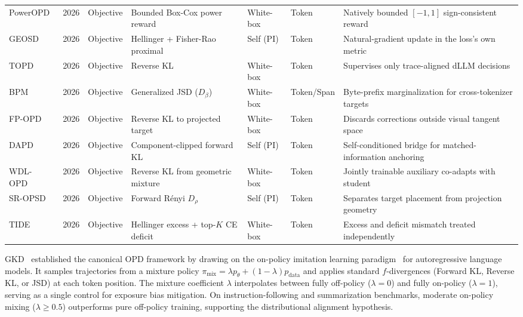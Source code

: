 \documentclass{article} %
\newcommand{\ptheta}{p_\theta}
\newcommand{\pdata}{p_{\mathrm{data}}}
\begin{document}
\begin{table}[t]
{\begin{tabular}{@{}lclllll@{}}
        PowerOPD~\citep{2606.17199} & 2026 & Objective & Bounded Box-Cox power reward & White-box & Token & Natively bounded $[-1,1]$ sign-consistent reward \\
        GEOSD~\citep{2607.06855} & 2026 & Objective & Hellinger + Fisher-Rao proximal & Self (PI) & Token & Natural-gradient update in the loss's own metric \\
        TOPD~\citep{2607.16872} & 2026 & Objective & Reverse KL & White-box & Token & Supervises only trace-aligned dLLM decisions \\
        BPM~\citep{2607.22334} & 2026 & Objective & Generalized JSD ($D_\beta$) & White-box & Token/Span & Byte-prefix marginalization for cross-tokenizer targets \\
        FP-OPD~\citep{2608.01263} & 2026 & Objective & Reverse KL to projected target & White-box & Token & Discards corrections outside visual tangent space \\
        DAPD~\citep{2608.01735} & 2026 & Objective & Component-clipped forward KL & Self (PI) & Token & Self-conditioned bridge for matched-information anchoring \\
        WDL-OPD~\citep{2608.09447} & 2026 & Objective & Reverse KL from geometric mixture & White-box & Token & Jointly trainable auxiliary co-adapts with student \\
        SR-OPSD~\citep{2608.09745} & 2026 & Objective & Forward R\'enyi $D_\rho$ & Self (PI) & Token & Separates target placement from projection geometry \\
        TIDE~\citep{2608.09836} & 2026 & Objective & Hellinger excess + top-$K$ CE deficit & White-box & Token & Excess and deficit mismatch treated independently \\
        \bottomrule
    \end{tabular}
    }
\end{table}

GKD~\citep{2306.13649} established the canonical OPD framework by drawing on the on-policy imitation learning paradigm~\citep{1011.0686} for autoregressive language models. It samples trajectories from a mixture policy $\pi_{\mathrm{mix}} = \lambda \ptheta + (1-\lambda) \pdata$ and applies standard $f$-divergences (Forward KL, Reverse KL, or JSD) at each token position. The mixture coefficient $\lambda$ interpolates between fully off-policy ($\lambda=0$) and fully on-policy ($\lambda=1$), serving as a single control for exposure bias mitigation. On instruction-following and summarization benchmarks, moderate on-policy mixing ($\lambda \geq 0.5$) outperforms pure off-policy training, supporting the distributional alignment hypothesis.
\end{document}
